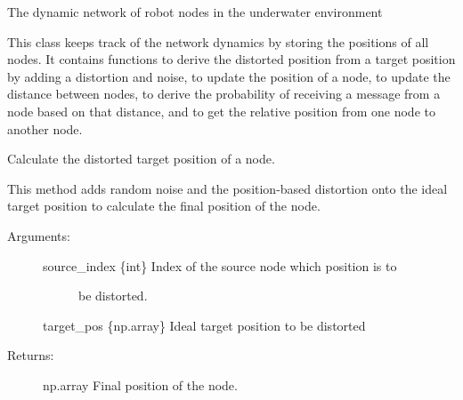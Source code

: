 \documentclass[letterpaper,10pt,english]{sphinxmanual}
\begin{document}
\begin{fulllineitems}
\label{\detokenize{index:environment.Environment}}
The dynamic network of robot nodes in the underwater environment

This class keeps track of the network dynamics by storing the positions of
all nodes. It contains functions to derive the distorted position from a
target position by adding a distortion and noise, to update the position of
a node, to update the distance between nodes, to derive the probability of
receiving a message from a node based on that distance, and to get the
relative position from one node to another node.

\begin{fulllineitems}
\label{\detokenize{index:environment.Environment.get_distorted_pos}}
Calculate the distorted target position of a node.

This method adds random noise and the position-based distortion onto
the ideal target position to calculate the final position of the node.
\begin{description}
\item[{Arguments:}] \leavevmode\begin{description}
\item[{source\_index \{int\} \textendash{} Index of the source node which position is to}] \leavevmode
be distorted.

\end{description}

target\_pos \{np.array\} \textendash{} Ideal target position to be distorted

\item[{Returns:}] \leavevmode
np.array \textendash{} Final position of the node.

\end{description}

\end{fulllineitems}


\end{fulllineitems}
\end{document}

